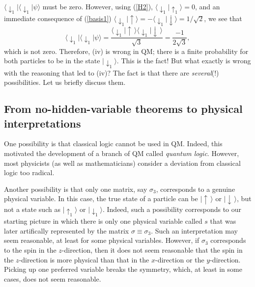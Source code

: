 \documentclass[12pt]{article}
\begin{document}
$\langle \downarrow_1\!|\langle \downarrow_1\!|\psi\rangle$ must 
be zero. However, using (\ref{H2}), 
$\langle \downarrow_1\!|\!\uparrow_1\rangle =0$, and
an immediate consequence of (\ref{basis1}) 
$\langle \downarrow_1\!|\!\uparrow\rangle = 
-\langle \downarrow_1\!|\!\downarrow\rangle =1/\sqrt{2}$,
we see that
\begin{equation}
\langle \downarrow_1\!|\langle \downarrow_1\!|\psi\rangle =
\frac{
\langle \downarrow_1\!|\!\uparrow\,\rangle
\langle \downarrow_1\!|\!\downarrow\,\rangle }{\sqrt{3}}
=\frac{-1}{2\sqrt{3}} ,
\end{equation} 
which is not zero. Therefore, (iv) is wrong in QM; there is a finite 
probability for both particles to be in the state
$|\!\downarrow_1\rangle$. This is the fact!
But what exactly is wrong with the reasoning that led to (iv)?
The fact is that there are {\em several}(!) possibilities. Let us 
briefly discuss them.

\subsection{From no-hidden-variable theorems to physical interpretations}

One possibility is that classical logic cannot be used 
in QM. Indeed, this motivated the development of a branch of QM
called {\em quantum logic}. However, most physicists 
(as well as mathematicians) consider 
a deviation from classical logic too radical. 

Another possibility is that only one matrix, say $\sigma_3$, 
corresponds to a genuine physical variable. In this case, the 
true state of a particle can be $|\!\uparrow\,\rangle$ or 
$|\!\downarrow\,\rangle$, but not a state such as
$|\!\uparrow_1\rangle$ or $|\!\downarrow_1\rangle$. Indeed, such a 
possibility corresponds to our starting picture in which there 
is only one physical variable called $s$ that was later artifically 
represented by the matrix $\sigma\equiv\sigma_3$. Such an 
interpretation may seem reasonable, at least for some physical 
variables. However, if $\sigma_3$ corresponds to the spin
in the $z$-direction, then it does not seem reasonable that 
the spin in the $z$-direction is more physical than that in 
the $x$-direction or the $y$-direction. Picking up one 
preferred variable breaks the symmetry, which, at least in some cases, 
does not seem reasonable.
\end{document}
